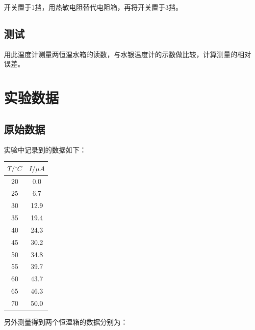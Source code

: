 \documentclass[a4paper]{ltxdoc}
\newenvironment{Figure}
{\par\medskip\noindent\minipage{\linewidth}}
{\endminipage\par\medskip}
\begin{document}
\begin{multicols}{2}
    开关置于1挡，用热敏电阻替代电阻箱，再将开关置于3挡。

    \subsection{测试}

    用此温度计测量两恒温水箱的读数，与水银温度计的示数做比较，计算测量的相对误差。

    \section{实验数据}

    \subsection{原始数据}

    实验中记录到的数据如下：

    \begin{Figure}
        \centering
        \begin{tabular}{|c|c|}
            \hline
            \textbf{$T/{}^{\circ}C$} & \textbf{$I/\mu A$} \\\hline
            20                       & 0.0                \\\hline
            25                       & 6.7                \\\hline
            30                       & 12.9               \\\hline
            35                       & 19.4               \\\hline
            40                       & 24.3               \\\hline
            45                       & 30.2               \\\hline
            50                       & 34.8               \\\hline
            55                       & 39.7               \\\hline
            60                       & 43.7               \\\hline
            65                       & 46.3               \\\hline
            70                       & 50.0               \\\hline
        \end{tabular}
    \end{Figure}
    另外测量得到两个恒温箱的数据分别为：


\end{multicols}
\end{document}
